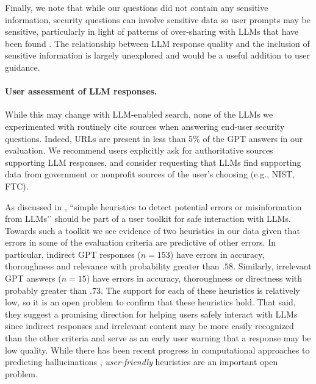 Finally, we note that while our questions did not contain any sensitive information, security questions can involve sensitive data so user prompts may be sensitive, particularly in light of patterns of over-sharing with LLMs that have been found \cite{zhang2024s}. The relationship between LLM response quality and the inclusion of sensitive information is largely unexplored and would be a useful addition to user guidance.


\paragraph{User assessment of LLM responses.} While this may change with LLM-enabled search, none of the LLMs we experimented with routinely cite sources when answering end-user security questions. Indeed, URLs are present in less than 5\% of the GPT answers in our evaluation. We recommend users explicitly ask for authoritative sources supporting LLM responses, and consider requesting that LLMs find supporting data from government or nonprofit sources of the user’s choosing (e.g., NIST, FTC).

As discussed in \cite{barman2024beyond}, ``simple heuristics to detect potential
errors or misinformation from LLMs’’ should be part of a user toolkit for safe interaction with LLMs. Towards such a toolkit we see evidence of two heuristics in our data given that errors in some of the evaluation criteria are predictive of other errors. In particular, indirect GPT responses ($n=153$) have errors in accuracy, thoroughness and relevance with probability greater than $.58$. Similarly, irrelevant GPT answers ($n=15$) have errors in accuracy, thoroughness or directness with probably greater than $.73$. The support for each of these heuristics is relatively low, so it is an open problem to confirm that these heuristics hold. That said, they suggest a promising direction for helping users safely interact with LLMs since indirect responses and irrelevant content may be more easily recognized than the other criteria and serve as an early user warning that a response may be low quality. While there has been recent progress in computational approaches to predicting hallucinations \cite{farquhar2024detecting}, \textit{user-friendly} heuristics are an important open problem.


